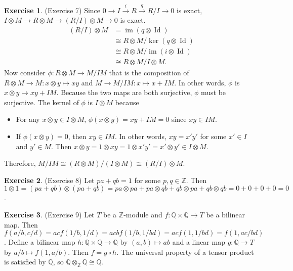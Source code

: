 \documentclass[12pt, psamsfonts]{amsart}
\theoremstyle{definition}
\newtheorem*{exer}{Exercise}
\theoremstyle{remark}
\DeclareMathOperator{\Id}{Id}
\DeclareMathOperator{\im}{im}
\numberwithin{equation}{section}
\begin{document}
\begin{exer}{(Exercise 7)}
  Since $0 \rightarrow I \xrightarrow{i} R \xrightarrow{q} R / I \rightarrow 0$ is exact, $I \otimes M \rightarrow R \otimes M \rightarrow (R / I) \otimes M \rightarrow 0$ is exact.
  \begin{align*}
    (R / I) \otimes M
      &= \im(q \otimes \Id) \\
      &\cong R \otimes M / \ker(q \otimes \Id) \\
      &\cong R \otimes M / \im(i \otimes \Id) \\
      &\cong R \otimes M / I \otimes M.
  \end{align*}
  Now consider $\phi: R \otimes M \rightarrow M / IM$ that is the composition of $R \otimes M \rightarrow M: x \otimes y \mapsto xy$ and $M \rightarrow M / IM: x \mapsto x + IM$.
  In other words, $\phi$ is $x \otimes y \mapsto xy + IM$.
  Because the two maps are both surjective, $\phi$ must be surjective.
  The kernel of $\phi$ is $I \otimes M$ because
  \begin{itemize}
    \item
      For any $x \otimes y \in I \otimes M$, $\phi(x \otimes y) = xy + IM = 0$ since $xy \in IM$.
    \item
      If $\phi(x \otimes y) = 0$, then $xy \in IM$.
      In other words, $xy = x'y'$ for some $x' \in I$ and $y' \in M$.
      Then $x \otimes y = 1 \otimes xy = 1 \otimes x'y' = x' \otimes y' \in I \otimes M$.
  \end{itemize}
  Therefore, $M / IM \cong (R \otimes M) / (I \otimes M) \cong (R / I) \otimes M$.
\end{exer}

\begin{exer}{(Exercise 8)}
  Let $pa + qb = 1$ for some $p, q \in \mathbb{Z}$.
  Then $1 \otimes 1 = (pa + qb) \otimes (pa + qb) = pa \otimes pa + pa \otimes qb + qb \otimes pa + qb \otimes qb = 0 + 0 + 0 + 0 = 0$.
\end{exer}

\begin{exer}{(Exercise 9)}
  Let $T$ be a $\mathbb{Z}$-module and $f: \mathbb{Q} \times \mathbb{Q} \rightarrow T$ be a bilinear map.
  Then $f(a/b, c/d) = acf(1/b, 1/d) = acbf(1/b, 1/bd) = acf(1, 1/bd) = f(1, ac/bd)$.
  Define a bilinear map $h: \mathbb{Q} \times \mathbb{Q} \rightarrow \mathbb{Q}$ by $(a, b) \mapsto ab$ and a linear map $g: \mathbb{Q} \rightarrow T$ by $a/b \mapsto f(1, a/b)$.
  Then $f = g \circ h$.
  The universal property of a tensor product is satisfied by $\mathbb{Q}$, so $\mathbb{Q} \otimes_{\mathbb{Z}} \mathbb{Q} \cong \mathbb{Q}$.
\end{exer}
\end{document}
